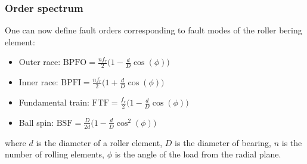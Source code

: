 \begin{frame}
    \frametitle{Order spectrum}
    \small
    
    One can now define fault orders corresponding to fault modes of the roller bering element:
    
    \begin{itemize}
        \item Outer race: $\text{BPFO}=\frac{nf_r}{2} \big( 1 - \frac{d}{D} \cos(\phi) \big) $
        
        \item Inner race: $\text{BPFI}=\frac{nf_r}{2} \big( 1 + \frac{d}{D} \cos(\phi) \big) $
        
        \item Fundamental train: $\text{FTF}=\frac{f_r}{2} \big( 1 - \frac{d}{D} \cos(\phi) \big) $
        
        \item Ball spin: $\text{BSF}=\frac{D}{2d} \big( 1 - \frac{d}{D} \cos^2(\phi) \big) $
    \end{itemize}
    
    where $d$ is the diameter of a roller element, $D$ is the diameter of bearing, $n$ is the number of rolling elements, $\phi$ is the angle of the load from the radial plane. 
   
\end{frame}